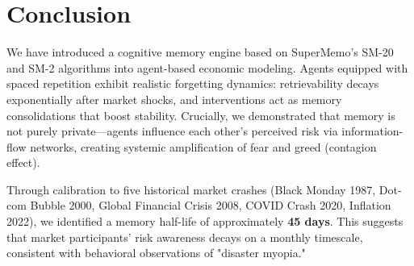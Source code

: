 \documentclass[11pt]{article}
\begin{document}
{{{\section{Conclusion}
We have introduced a cognitive memory engine based on SuperMemo's SM-20 and SM-2 algorithms into agent-based economic modeling. Agents equipped with spaced repetition exhibit realistic forgetting dynamics: retrievability decays exponentially after market shocks, and interventions act as memory consolidations that boost stability. Crucially, we demonstrated that memory is not purely private—agents influence each other's perceived risk via information-flow networks, creating systemic amplification of fear and greed (contagion effect).

Through calibration to five historical market crashes (Black Monday 1987, Dot-com Bubble 2000, Global Financial Crisis 2008, COVID Crash 2020, Inflation 2022), we identified a memory half-life of approximately \textbf{45 days}. This suggests that market participants' risk awareness decays on a monthly timescale, consistent with behavioral observations of "disaster myopia."

}}}
\end{document}
